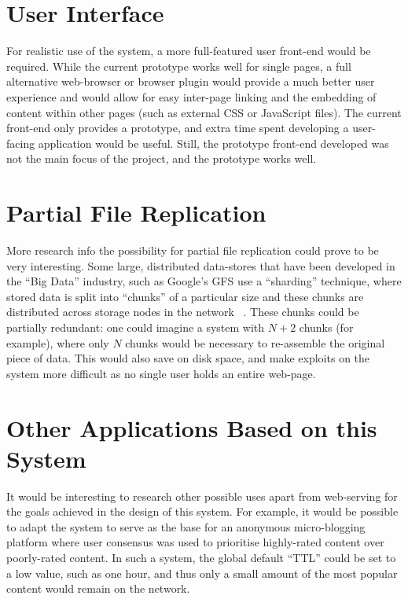 \section{User Interface}

For realistic use of the system, a more full-featured user front-end would be required.
While the current prototype works well for single pages, a full alternative web-browser
or browser plugin would provide a much better user experience and would allow for easy
inter-page linking and the embedding of content within other pages (such as external
CSS or JavaScript files). The current front-end only provides a prototype, and extra
time spent developing a user-facing application would be useful. Still, the prototype
front-end developed was not the main focus of the project, and the prototype works
well.

\section{Partial File Replication}

More research info the possibility for partial file replication could prove to be
very interesting. Some large, distributed data-stores that have been developed in the
``Big Data'' industry, such as Google's GFS use a ``sharding'' technique, where stored data
is split into ``chunks'' of a particular size and these chunks are distributed across storage
nodes in the network ~\cite{gfs}. These chunks could be partially redundant: one could imagine a system with
$N+2$ chunks (for example), where only $N$ chunks would be necessary to re-assemble
the original piece of data. This would also save on disk space, and make exploits
on the system more difficult as no single user holds an entire web-page.

\section{Other Applications Based on this System}

It would be interesting to research other possible uses apart from web-serving for the goals
achieved in the design of this system. For example, it would be possible
to adapt the system to serve as the base for an anonymous micro-blogging platform where
user consensus was used to prioritise highly-rated content over poorly-rated content.
In such a system, the global default ``TTL'' could be set to a low value, such as
one hour, and thus only a small amount of the most popular content would remain on the network.

